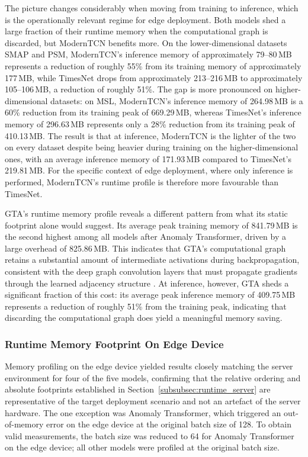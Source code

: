 \documentclass[twoside,11pt,openright]{report}
\begin{document}
The picture changes considerably when moving from training to inference, which is the
operationally relevant regime for edge deployment. Both models shed a large fraction
of their runtime memory when the computational graph is discarded, but ModernTCN
benefits more. On the lower-dimensional datasets SMAP and PSM, ModernTCN's inference
memory of approximately 79--80\,MB represents a reduction of roughly 55\% from its
training memory of approximately 177\,MB, while TimesNet drops from approximately
213--216\,MB to approximately 105--106\,MB, a reduction of roughly 51\%. The gap is
more pronounced on higher-dimensional datasets: on MSL, ModernTCN's inference memory
of 264.98\,MB is a 60\% reduction from its training peak of 669.29\,MB, whereas
TimesNet's inference memory of 296.63\,MB represents only a 28\% reduction from its
training peak of 410.13\,MB. The result is that at inference, ModernTCN is the
lighter of the two on every dataset despite being heavier during training on the
higher-dimensional ones, with an average inference memory of 171.93\,MB compared to
TimesNet's 219.81\,MB. For the specific context of edge deployment, where only
inference is performed, ModernTCN's runtime profile is therefore more favourable
than TimesNet.

GTA's runtime memory profile reveals a different pattern from what its static
footprint alone would suggest. Its average peak training memory of 841.79\,MB is
the second highest among all models after Anomaly Transformer, driven by a large
overhead of 825.86\,MB. This indicates that
GTA's computational graph retains a substantial amount of intermediate activations
during backpropagation, consistent with the deep graph convolution layers that must 
propagate gradients through the learned
adjacency structure \citep{gta2022}. At inference, however, GTA sheds a
significant fraction of this cost: its average peak inference memory of 409.75\,MB
represents a reduction of roughly 51\% from the training peak, indicating that
discarding the computational graph does yield a meaningful memory saving.

\subsubsection{Runtime Memory Footprint On Edge Device}

Memory profiling on the edge device yielded results closely matching the server
environment for four of the five models, confirming that the relative ordering and
absolute footprints established in Section~\ref{subsubsec:runtime_server} are
representative of the target deployment scenario and not an artefact of the server
hardware. The one exception was Anomaly Transformer, which triggered an
out-of-memory error on the edge device at the original batch size of 128. To obtain
valid measurements, the batch size was reduced to 64 for Anomaly Transformer on the
edge device; all other models were profiled at the original batch size.
\end{document}
